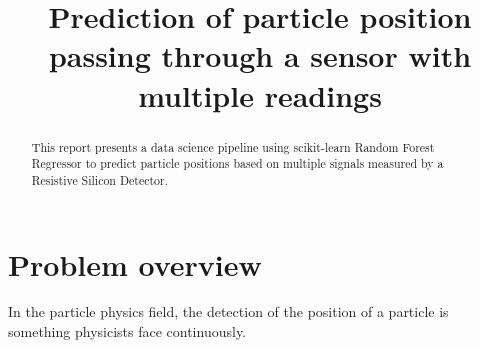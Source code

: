 \documentclass[conference]{IEEEtran}
\begin{document}
\title{Prediction of particle position passing through a sensor with multiple readings}

\author{
}

\maketitle


\begin{abstract}
This report presents a data science pipeline using scikit-learn Random Forest Regressor to 
predict particle positions based on multiple signals measured by a Resistive Silicon Detector.
\end{abstract}

\section{Problem overview}
In the particle physics field, the detection of the position of a particle is something physicists face continuously. 


\end{document}

